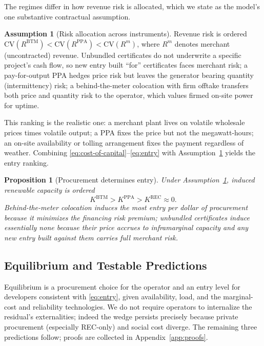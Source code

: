 \documentclass[a4paper,fleqn,longmktitle]{cas-sc}
\theoremstyle{plain}
\newtheorem{proposition}{Proposition}
\theoremstyle{definition}
\newtheorem{assumption}{Assumption}
\newcommand{\REC}{\mathrm{REC}}
\newcommand{\PPA}{\mathrm{PPA}}
\newcommand{\BTM}{\mathrm{BTM}}
\begin{document}
The regimes differ in how revenue risk is allocated, which we state as the model's one substantive contractual assumption.

\begin{assumption}[Risk allocation across instruments]\label{ass:risk}
Revenue risk is ordered $\mathrm{CV}(R^{\BTM})<\mathrm{CV}(R^{\PPA})<\mathrm{CV}(R^{m})$, where $R^{m}$ denotes merchant (uncontracted) revenue. Unbundled certificates do not underwrite a specific project's cash flow, so new entry built ``for'' certificates faces merchant risk; a pay-for-output PPA hedges price risk but leaves the generator bearing quantity (intermittency) risk; a behind-the-meter colocation with firm offtake transfers both price and quantity risk to the operator, which values firmed on-site power for uptime.
\end{assumption}

This ranking is the realistic one: a merchant plant lives on volatile wholesale prices times volatile output; a PPA fixes the price but not the megawatt-hours; an on-site availability or tolling arrangement fixes the payment regardless of weather. Combining \eqref{eq:cost-of-capital}--\eqref{eq:entry} with Assumption~\ref{ass:risk} yields the entry ranking.

\begin{proposition}[Procurement determines entry]\label{prop:entry}
Under Assumption~\ref{ass:risk}, induced renewable capacity is ordered
\begin{equation}
    K^{\BTM}>K^{\PPA}>K^{\REC}\approx 0.
\end{equation}
Behind-the-meter colocation induces the most entry per dollar of procurement because it minimizes the financing risk premium; unbundled certificates induce essentially none because their price accrues to inframarginal capacity and any new entry built against them carries full merchant risk.
\end{proposition}

\subsection{Equilibrium and Testable Predictions}\label{subsec:predictions}

Equilibrium is a procurement choice for the operator and an entry level for developers consistent with \eqref{eq:entry}, given availability, load, and the marginal-cost and reliability technologies. We do not require operators to internalize the residual's externalities; indeed the wedge persists precisely because private procurement (especially REC-only) and social cost diverge. The remaining three predictions follow; proofs are collected in Appendix~\ref{app:proofs}.
\end{document}
